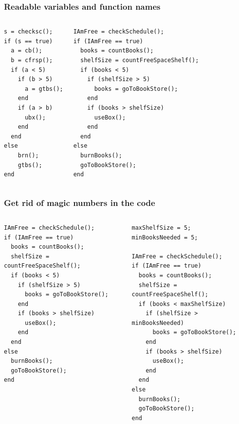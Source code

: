 \begin{frame}[fragile]
 \frametitle{Readable variables and function names}
 \begin{columns}[T]
\begin{lstlisting}
s = checksc();
if (s == true)
  a = cb();
  b = cfrsp();
  if (a < 5)
    if (b > 5)
      a = gtbs();
    end
    if (a > b)
      ubx();
    end
  end
else
    brn();
    gtbs();
end
 \end{lstlisting}
     \begin{lstlisting}
IAmFree = checkSchedule();
if (IAmFree == true)
  books = countBooks();
  shelfSize = countFreeSpaceShelf();
  if (books < 5)
    if (shelfSize > 5)
      books = goToBookStore();
    end
    if (books > shelfSize)
      useBox();
    end
  end
else
  burnBooks();
  goToBookStore();
end
 \end{lstlisting}
 \end{columns}
\end{frame}

\begin{frame}[fragile]
 \frametitle{Get rid of magic numbers in the code}
 \begin{columns}[T]
     \begin{lstlisting}[basicstyle=\scriptsize\ttfamily]
IAmFree = checkSchedule();
if (IAmFree == true)
  books = countBooks();
  shelfSize = countFreeSpaceShelf();
  if (books < 5)
    if (shelfSize > 5)
      books = goToBookStore();
    end
    if (books > shelfSize)
      useBox();
    end
  end
else
  burnBooks();
  goToBookStore();
end
 \end{lstlisting}
     \begin{lstlisting}[basicstyle=\scriptsize\ttfamily,emph={minBooksNeeded,maxShelfSize},emphstyle=\color{red}]
maxShelfSize = 5;
minBooksNeeded = 5;

IAmFree = checkSchedule();
if (IAmFree == true)
  books = countBooks();
  shelfSize = countFreeSpaceShelf();
  if (books < maxShelfSize)
    if (shelfSize > minBooksNeeded)
      books = goToBookStore();
    end
    if (books > shelfSize)
      useBox();
    end
  end
else
  burnBooks();
  goToBookStore();
end
 \end{lstlisting}
 \end{columns}
\end{frame}

